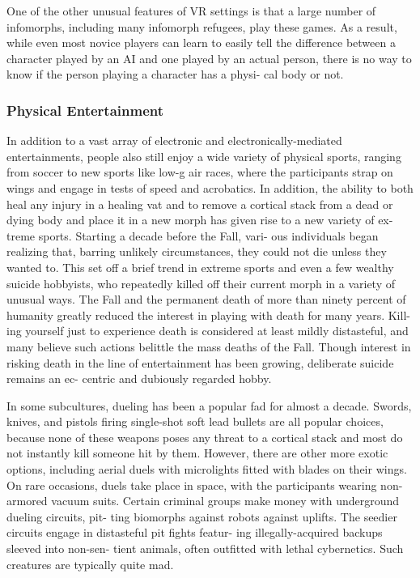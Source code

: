 One of the other unusual features of VR settings is 
that a large number of infomorphs, including many 
infomorph refugees, play these games. As a result, 
while even most novice players can learn to easily tell 
the difference between a character played by an AI 
and one played by an actual person, there is no way 
to know if the person playing a character has a physi-
cal body or not.

\subsubsection{Physical Entertainment}

In addition to a vast array of electronic and 
electronically-mediated entertainments, people also 
still enjoy a wide variety of physical sports, ranging 
from soccer to new sports like low-g air races, where 
the participants strap on wings and engage in tests 
of speed and acrobatics. In addition, the ability to 
both heal any injury in a healing vat and to remove a 
cortical stack from a dead or dying body and place it 
in a new morph has given rise to a new variety of ex-
treme sports. Starting a decade before the Fall, vari-
ous individuals began realizing that, barring unlikely 
circumstances, they could not die unless they wanted 
to. This set off a brief trend in extreme sports and 
even a few wealthy suicide hobbyists, who repeatedly 
killed off their current morph in a variety of unusual 
ways. The Fall and the permanent death of more 
than ninety percent of humanity greatly reduced the 
interest in playing with death for many years. Kill-
ing yourself just to experience death is considered 
at least mildly distasteful, and many believe such 
actions belittle the mass deaths of the Fall. Though 
interest in risking death in the line of entertainment 
has been growing, deliberate suicide remains an ec-
centric and dubiously regarded hobby.

In some subcultures, dueling has been a popular fad 
for almost a decade. Swords, knives, and pistols firing 
single-shot soft lead bullets are all popular choices, 
because none of these weapons poses any threat to a 
cortical stack and most do not instantly kill someone 
hit by them. However, there are other more exotic 
options, including aerial duels with microlights fitted 
with blades on their wings. On rare occasions, duels 
take place in space, with the participants wearing 
non-armored vacuum suits. Certain criminal groups 
make money with underground dueling circuits, pit-
ting biomorphs against robots against uplifts. The 
seedier circuits engage in distasteful pit fights featur-
ing illegally-acquired backups sleeved into non-sen-
tient animals, often outfitted with lethal cybernetics. 
Such creatures are typically quite mad.

